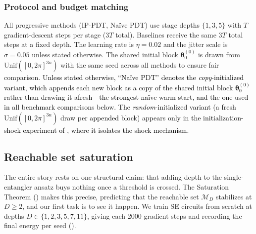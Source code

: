 \documentclass[11pt]{article}
\theoremstyle{plain}
\theoremstyle{plain}
\begin{document}
\subsubsection{Protocol and budget matching}\label{sec:protocol}
All progressive methods (IP-PDT, Na\"ive PDT) use stage depths
$\{1,3,5\}$ with $T$ gradient-descent steps per stage ($3T$ total).
Baselines receive the same $3T$ total steps at a fixed depth.  The
learning rate is $\eta=0.02$ and the jitter scale is $\sigma=0.05$
unless stated otherwise.  The shared initial block
$\bm\theta_0^{(0)}$ is drawn from
$\mathrm{Unif}([0,2\pi]^{3n})$ with the same seed across all methods
to ensure fair comparison.
\textcolor{black}{Unless stated otherwise, ``Na\"ive PDT'' denotes the \emph{copy}-initialized
variant, which appends each new block as a copy of the shared initial
block $\bm\theta_0^{(0)}$ rather than drawing it afresh---the strongest
na\"ive warm start, and the one used in all benchmark comparisons below.
The \emph{random}-initialized variant (a fresh $\mathrm{Unif}([0,2\pi]^{3n})$
draw per appended block) appears only in the initialization-shock
experiment of , where it isolates the shock mechanism.}
\subsection{Reachable set saturation}\label{sec:exp_saturation}
The entire story rests on one structural claim: that adding depth to the
single-entangler ansatz buys nothing once a threshold is crossed.  The
Saturation Theorem () makes this precise, predicting
that the reachable set $\mathcal{M}_D$ stabilizes at $D\geq 2$, and our
first task is to see it happen.  We train SE circuits from scratch at
depths $D\in\{1,2,3,5,7,11\}$, giving each $2000$ gradient steps and
recording the final energy per seed ().
\end{document}
